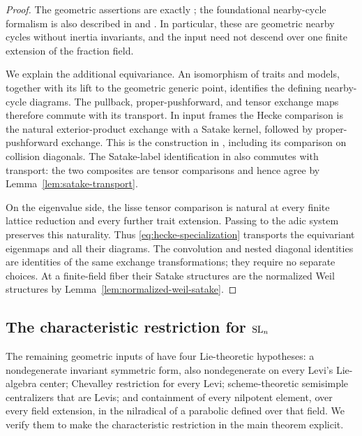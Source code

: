 \begin{proof}
The geometric assertions are exactly
\cite[Propositions~2.1 and~5.1]{CT}; the foundational nearby-cycle
formalism is also described in \cite[Section~4.1]{GR} and
\cite[Theorems~4.1 and~6.7]{HansenScholze}. In particular, these are
geometric nearby cycles without inertia invariants, and the input need
not descend over one finite extension of the fraction field.

We explain the additional equivariance. An isomorphism of traits and
models, together with its lift to the geometric generic point, identifies
the defining nearby-cycle diagrams. The pullback, proper-pushforward,
and tensor exchange maps therefore commute with its transport. In input
frames the Hecke comparison is the natural exterior-product exchange
with a Satake kernel, followed by proper-pushforward exchange. This is
the construction in \cite[Section~5]{CT}, including its comparison on
collision diagonals. The Satake-label identification in
\cite[Lemma~5.3]{CT} also commutes with transport: the two composites
are tensor comparisons and hence agree by
Lemma~\ref{lem:satake-transport}.

On the eigenvalue side, the lisse tensor comparison is natural at every
finite lattice reduction and every further trait extension. Passing to
the adic system preserves this naturality. Thus
\eqref{eq:hecke-specialization} transports the equivariant eigenmaps
and all their diagrams. The convolution and nested diagonal identities
are identities of the same exchange transformations; they require no
separate choices. At a finite-field fiber their Satake structures are
the normalized Weil structures by
Lemma~\ref{lem:normalized-weil-satake}.
\end{proof}

\subsection{The characteristic restriction for \texorpdfstring{$\mathrm{SL}_n$}{SLn}}

The remaining geometric inputs of \cite{CT} have four Lie-theoretic
hypotheses: a nondegenerate invariant symmetric form, also nondegenerate
on every Levi's Lie-algebra center; Chevalley restriction for every Levi;
scheme-theoretic semisimple centralizers that are Levis; and containment
of every nilpotent element, over every field extension, in the nilradical
of a parabolic defined over that field. We verify them to make the
characteristic restriction in the main theorem explicit.

